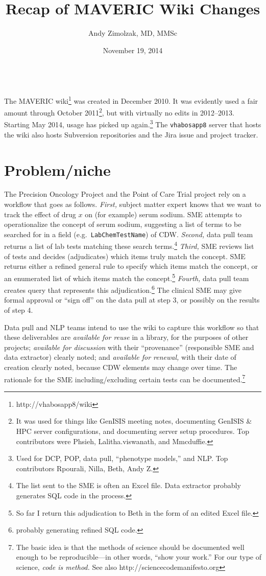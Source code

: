 \documentclass{tufte-handout}
\title{Recap of MAVERIC Wiki Changes}
\author{Andy Zimolzak, MD, MMSc}
\date{November 19, 2014}
\begin{document}
\maketitle

~\\

The MAVERIC wiki\footnote{http://vhabosapp8/wiki} was created in
December 2010. It was evidently used a fair amount through October
2011\footnote{It was used for things like GenISIS meeting notes,
  documenting GenISIS \& HPC server configurations, and documenting
  server setup procedures. Top contributors were Phsieh,
  Lalitha.viswanath, and Mmcduffie.}, but with virtually no edits in
2012--2013. Starting May 2014, usage has picked up
again.\footnote{Used for DCP, POP, data pull, ``phenotype models,''
  and NLP. Top contributors Rpourali, Nilla, Beth, Andy Z.} The
\texttt{vhabosapp8} server that hosts the wiki also hosts Subversion
repositories and the Jira issue and project tracker.

\section{Problem/niche}

The Precision Oncology Project and the Point of Care Trial project
rely on a workflow that goes as follows. \emph{First,} subject matter
expert knows that we want to track the effect of drug $x$ on (for
example) serum sodium. SME attempts to operationalize the concept of
serum sodium, suggesting a list of terms to be searched for in a field
(e.g.\ \texttt{LabChemTestName}) of CDW. \emph{Second,} data pull team
returns a list of lab tests matching these search terms.\footnote{The
  list sent to the SME is often an Excel file. Data extractor probably
  generates SQL code in the process.} \emph{Third,} SME reviews list
of tests and decides (adjudicates) which items truly match the
concept. SME returns either a refined general rule to specify which
items match the concept, or an enumerated list of which items match
the concept.\footnote{So far I return this adjudication to Beth in the
  form of an edited Excel file.} \emph{Fourth,} data pull team creates
query that represents this adjudication.\footnote{probably generating
  refined SQL code.} The clinical SME may give formal approval or
``sign off'' on the data pull at step 3, or possibly on the results of
step 4.

Data pull and NLP teams intend to use the wiki to capture this
workflow so that these deliverables are \emph{available for reuse} in
a library, for the purposes of other projects; \emph{available for
  discussion} with their ``provenance'' (responsible SME and data
extractor) clearly noted; and \emph{available for renewal,} with their
date of creation clearly noted, because CDW elements may change over
time. The rationale for the SME including/excluding certain tests can
be documented.\footnote{The basic idea is that the methods of science
  should be documented well enough to be reproducible---in other
  words, ``show your work.'' For our type of science, \emph{code is
    method.} See also http://sciencecodemanifesto.org}
\end{document}
